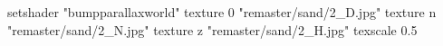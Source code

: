 setshader "bumpparallaxworld"
    texture 0 "remaster/sand/2_D.jpg"
    texture n "remaster/sand/2_N.jpg"
    texture z "remaster/sand/2_H.jpg"
    texscale 0.5